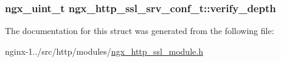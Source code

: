 \hypertarget{structngx__http__ssl__srv__conf__t_adce23a87cd5e4a717a8ee4d17fa945e4}{
\subsubsection[{verify\-\_\-depth}]{\setlength{\rightskip}{0pt plus 5cm}ngx\-\_\-uint\-\_\-t ngx\-\_\-http\-\_\-ssl\-\_\-srv\-\_\-conf\-\_\-t\-::verify\-\_\-depth}}\label{structngx__http__ssl__srv__conf__t_adce23a87cd5e4a717a8ee4d17fa945e4}


The documentation for this struct was generated from the following file\-:\begin{DoxyCompactItemize}
\item 
nginx-\/1../src/http/modules/\hyperlink{ngx__http__ssl__module_8h}{ngx\-\_\-http\-\_\-ssl\-\_\-module.\-h}\end{DoxyCompactItemize}
